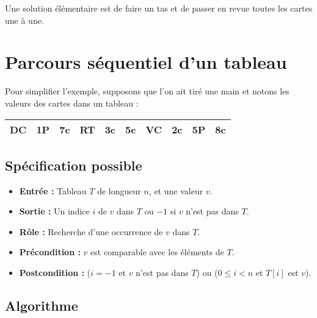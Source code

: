Une solution élémentaire est de faire un tas et de passer en revue toutes les cartes une à une.

\section{Parcours séquentiel d'un tableau}

Pour simplifier l'exemple, supposons que l'on ait tiré une main et notons les valeurs des cartes dans un tableau :

\begin{center}
\begin{minipage}{8.5cm}
\begin{tabular}{|c|c|c|c|c|c|c|c|c|c|}
\hline
\small DC &\small 1P &\small 7c &\small RT &\small 3c &\small 5c&\small VC&\small 2c&\small 5P&\small 8c\\
\hline
\end{tabular}
\end{minipage}

\end{center}

\subsection{Spécification possible}

\begin{itemize}
	\item {\bfseries Entrée :} Tableau $T$ de longueur $n$, et une valeur $v$.
	\item {\bfseries Sortie :} Un indice $i$ de $v$ dans $T$ ou $-1$ si $v$ n'est pas dans $T$. 
	\item {\bfseries Rôle :} Recherche d'une occurrence de $v$ dans $T$.
	\item {\bfseries Précondition :} $v$ est comparable avec les éléments de $T$.
	\item {\bfseries Postcondition :} ($i=-1$ et $v$ n'est pas dans $T$) ou ($0\leqslant i < n$ et $T[i]$ est $v$).
\end{itemize}

\subsection{Algorithme}

